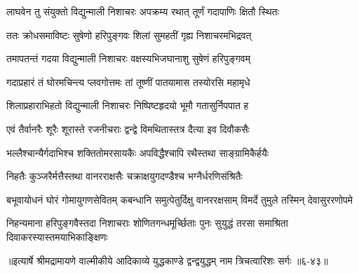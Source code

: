 \twolineshloka
{लाघवेन तु संयुक्तो विद्युन्माली निशाचरः}
{अपक्रम्य रथात् तूर्णं गदापाणिः क्षितौ स्थितः} %

\twolineshloka
{ततः क्रोधसमाविष्टः सुषेणो हरिपुङ्गवः}
{शिलां सुमहतीं गृह्य निशाचरमभिद्रवत्} %

\twolineshloka
{तमापतन्तं गदया विद्युन्माली निशाचरः}
{वक्षस्यभिजघानाशु सुषेणं हरिपुङ्गवम्} %

\twolineshloka
{गदाप्रहारं तं घोरमचिन्त्य प्लवगोत्तमः}
{तां तूष्णीं पातयामास तस्योरसि महामृधे} %

\twolineshloka
{शिलाप्रहाराभिहतो विद्युन्माली निशाचरः}
{निष्पिष्टहृदयो भूमौ गतासुर्निपपात ह} %

\twolineshloka
{एवं तैर्वानरैः शूरैः शूरास्ते रजनीचराः}
{द्वन्द्वे विमथितास्तत्र दैत्या इव दिवौकसैः} %

\twolineshloka
{भल्लैश्चान्यैर्गदाभिश्च शक्तितोमरसायकैः}
{अपविद्धैश्चापि रथैस्तथा साङ्ग्रामिकैर्हयैः} %

\twolineshloka
{निहतैः कुञ्जरैर्मत्तैस्तथा वानरराक्षसैः}
{चक्राक्षयुगदण्डैश्च भग्नैर्धरणिसंश्रितैः} %

\threelineshloka
{बभूवायोधनं घोरं गोमायुगणसेवितम्}
{कबन्धानि समुत्पेतुर्दिक्षु वानररक्षसाम्}
{विमर्दे तुमुले तस्मिन् देवासुररणोपमे} %

\twolineshloka
{निहन्यमाना हरिपुङ्गवैस्तदा निशाचराः शोणितगन्धमूर्च्छिताः}
{पुनः सुयुद्धं तरसा समाश्रिता दिवाकरस्यास्तमयाभिकाङ्क्षिणः} %


॥इत्यार्षे श्रीमद्रामायणे वाल्मीकीये आदिकाव्ये युद्धकाण्डे द्वन्द्वयुद्धम् नाम त्रिचत्वारिशः सर्गः ॥६-४३॥
